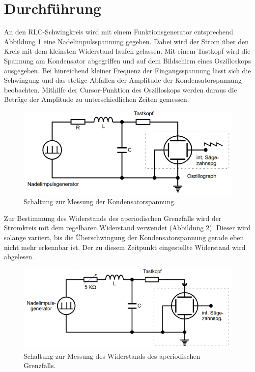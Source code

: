 \section{Durchführung}
\label{sec:Durchführung}

An den RLC-Schwingkreis wird mit einem Funktionsgenerator entsprechend Abbildung \ref{fig:Schaltung1}
eine Nadelimpulsspannung gegeben. Dabei wird der Strom über den Kreis mit dem kleinsten
Widerstand laufen gelassen. Mit einem Tastkopf wird die Spannung am Kondensator
abgegriffen und auf dem Bildschirm eines Oszilloskops ausgegeben. Bei hinreichend kleiner Frequenz der
Eingangsspannung lässt sich die Schwingung und das stetige Abfallen der Amplitude
der Kondensatorspannung beobachten. Mithilfe der Cursor-Funktion des Oszilloskops
werden daraus die Beträge der Amplitude zu unterschiedlichen Zeiten gemessen.

\begin{figure}[H]
  \centering
  \includegraphics[width=14cm]{Schaltung1.PNG}
  \caption{Schaltung zur Messung der Kondensatorspannung. \cite{sample}}
  \label{fig:Schaltung1}
\end{figure}

Zur Bestimmung des Widerstands des aperiodischen Grenzfalls wird der Stromkreis
mit dem regelbaren Widerstand verwendet (Abbildung \ref{fig:Schaltung2}). Dieser wird solange variiert, bis die
Überschwingung der Kondensatorspannung gerade eben nicht mehr erkennbar ist.
Der zu diesem Zeitpunkt eingestellte Widerstand wird abgelesen.

\begin{figure}[H]
  \centering
  \includegraphics[width=14cm]{Schaltung2.PNG}
  \caption{Schaltung zur Messung des Widerstands des aperiodischen Grenzfalls. \cite{sample}}
  \label{fig:Schaltung2}
\end{figure}

